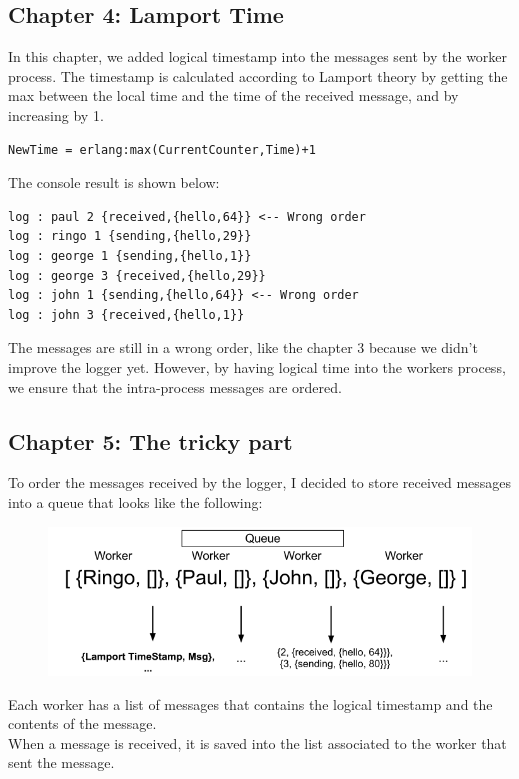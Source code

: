 \documentclass[a4paper, 11pt]{article}
\begin{document}
\subsection{Chapter 4: Lamport Time}
In this chapter, we added logical timestamp into the messages sent by the worker process. The timestamp is calculated according to Lamport theory by getting the max between the local time and the time of the received message, and by increasing by 1.
\begin{verbatim}
NewTime = erlang:max(CurrentCounter,Time)+1
\end{verbatim}
The console result is shown below:
\begin{verbatim}
log : paul 2 {received,{hello,64}} <-- Wrong order 
log : ringo 1 {sending,{hello,29}}
log : george 1 {sending,{hello,1}}
log : george 3 {received,{hello,29}}
log : john 1 {sending,{hello,64}} <-- Wrong order 
log : john 3 {received,{hello,1}}
\end{verbatim}

The messages are still in a wrong order, like the chapter 3 because we didn't improve the logger yet. However, by having logical time into the workers process, we ensure that the intra-process messages are ordered.

\subsection{Chapter 5: The tricky part}
To order the messages received by the logger, I decided to store received messages into a queue that looks like the following:

\begin{figure}[H]
\includegraphics[scale=0.5]{archi_5.png}
\centering
\end{figure}

Each worker has a list of messages that contains the logical timestamp and the contents of the message.\\
When a message is received, it is saved into the list associated to the worker that sent the message. 
\end{document}
